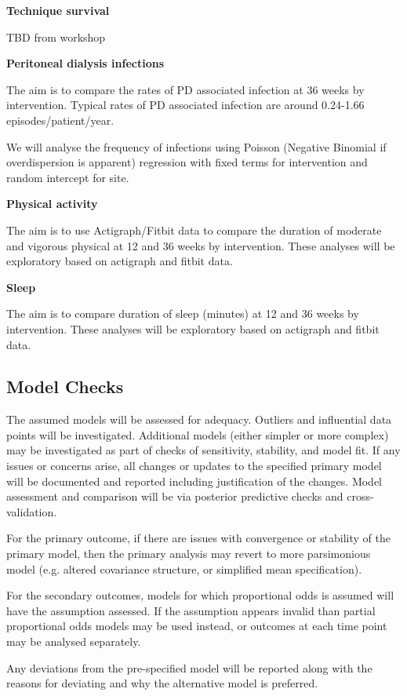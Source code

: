 \documentclass[11pt,parskip=half-]{scrartcl}
\begin{document}
\textbf{Technique survival}

TBD from workshop

\textbf{Peritoneal dialysis infections}

The aim is to compare the rates of PD associated infection at 36 weeks by intervention. Typical rates of PD associated infection are around 0.24-1.66 episodes/patient/year.

We will analyse the frequency of infections using Poisson (Negative Binomial if overdispersion is apparent) regression with fixed terms for intervention and random intercept for site.

\textbf{Physical activity}

The aim is to use Actigraph/Fitbit data to compare the duration of moderate and vigorous physical at 12 and 36 weeks by intervention. These analyses will be exploratory based on actigraph and fitbit data.

\textbf{Sleep}

The aim is to compare duration of sleep (minutes) at 12 and 36 weeks by intervention. These analyses will be exploratory based on actigraph and fitbit data.

\subsection{Model Checks}\label{model-checks}

The assumed models will be assessed for adequacy. Outliers and influential data points will be investigated. Additional models (either simpler or more complex) may be investigated as part of checks of sensitivity, stability, and model fit. If any issues or concerns arise, all changes or updates to the specified primary model will be documented and reported including justification of the changes. Model assessment and comparison will be via posterior predictive checks and cross-validation.

For the primary outcome, if there are issues with convergence or stability of the primary model, then the primary analysis may revert to more parsimonious model (e.g. altered covariance structure, or simplified mean specification).

For the secondary outcomes, models for which proportional odds is assumed will have the assumption assessed. If the assumption appears invalid than partial proportional odds models may be used instead, or outcomes at each time point may be analysed separately.

Any deviations from the pre-specified model will be reported along with the reasons for deviating and why the alternative model is preferred.
\end{document}
